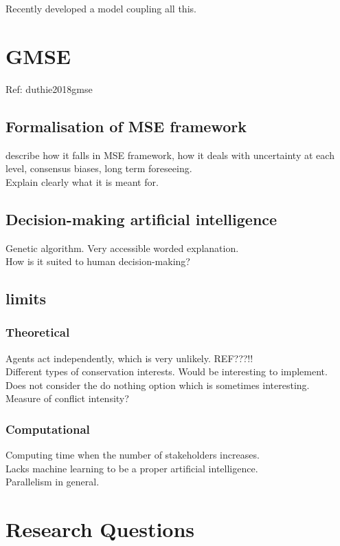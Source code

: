 \documentclass[12pt,a4paper]{article}
\begin{document}
Recently developed a model coupling all this.
\section{GMSE} Ref: duthie2018gmse

\subsection{Formalisation of MSE framework}

describe how it falls in MSE framework, how it deals with uncertainty at each level, consensus biases, long term foreseeing.\\
Explain clearly what it is meant for.

\subsection{Decision-making artificial intelligence}

Genetic algorithm. Very accessible worded explanation.\\
How is it suited to human decision-making?

\subsection{limits}

\subsubsection{Theoretical}

Agents act independently, which is very unlikely. REF???!!\\
Different types of conservation interests.
Would be interesting to implement.\\
Does not consider the do nothing option which is sometimes interesting.\\
Measure of conflict intensity?

\subsubsection{Computational}
Computing time when the number of stakeholders increases.\\
Lacks machine learning to be a proper artificial intelligence.\\
Parallelism in general.

\section{Research Questions}
\end{document}
